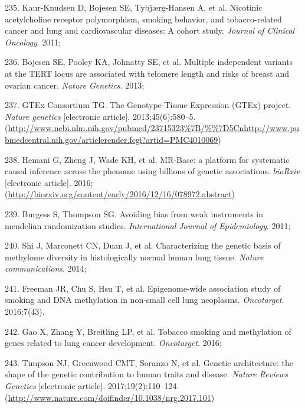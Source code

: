 \documentclass[11pt,oneside]{bristolthesis}
\newenvironment{cslreferences}%
  {}%
  {\par}
\begin{document}
\begin{cslreferences}
\leavevmode\hypertarget{ref-Kaur-Knudsen2011}{}%
235. Kaur-Knudsen D, Bojesen SE, Tybjærg-Hansen A, et al. Nicotinic acetylcholine receptor polymorphism, smoking behavior, and tobacco-related cancer and lung and cardiovascular diseases: A cohort study. \emph{Journal of Clinical Oncology}. 2011;

\leavevmode\hypertarget{ref-Bojesen2013}{}%
236. Bojesen SE, Pooley KA, Johnatty SE, et al. Multiple independent variants at the TERT locus are associated with telomere length and risks of breast and ovarian cancer. \emph{Nature Genetics}. 2013;

\leavevmode\hypertarget{ref-GTExConsortium2013}{}%
237. GTEx Consortium TG. The Genotype-Tissue Expression (GTEx) project. \emph{Nature genetics} {[}electronic article{]}. 2013;45(6):580--5. (\url{http://www.ncbi.nlm.nih.gov/pubmed/23715323\%7B/\%\%7D5Cnhttp://www.pubmedcentral.nih.gov/articlerender.fcgi?artid=PMC4010069})

\leavevmode\hypertarget{ref-Hemani2016}{}%
238. Hemani G, Zheng J, Wade KH, et al. MR-Base: a platform for systematic causal inference across the phenome using billions of genetic associations. \emph{bioRxiv} {[}electronic article{]}. 2016;(\url{http://biorxiv.org/content/early/2016/12/16/078972.abstract})

\leavevmode\hypertarget{ref-Burgess2011}{}%
239. Burgess S, Thompson SG. Avoiding bias from weak instruments in mendelian randomization studies. \emph{International Journal of Epidemiology}. 2011;

\leavevmode\hypertarget{ref-Shi2014}{}%
240. Shi J, Marconett CN, Duan J, et al. Characterizing the genetic basis of methylome diversity in histologically normal human lung tissue. \emph{Nature communications}. 2014;

\leavevmode\hypertarget{ref-Freeman2016}{}%
241. Freeman JR, Chu S, Hsu T, et al. Epigenome-wide association study of smoking and DNA methylation in non-small cell lung neoplasms. \emph{Oncotarget}. 2016;7(43).

\leavevmode\hypertarget{ref-Gao2016}{}%
242. Gao X, Zhang Y, Breitling LP, et al. Tobacco smoking and methylation of genes related to lung cancer development. \emph{Oncotarget}. 2016;

\leavevmode\hypertarget{ref-Timpson2017}{}%
243. Timpson NJ, Greenwood CMT, Soranzo N, et al. Genetic architecture: the shape of the genetic contribution to human traits and disease. \emph{Nature Reviews Genetics} {[}electronic article{]}. 2017;19(2):110--124. (\url{http://www.nature.com/doifinder/10.1038/nrg.2017.101})


\end{cslreferences}
\end{document}
